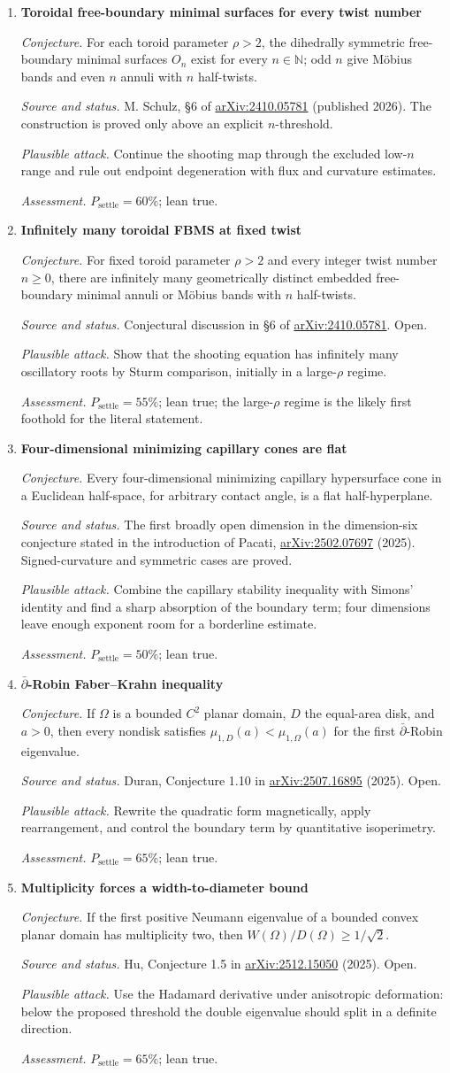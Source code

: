 \documentclass[11pt]{article}
\newcommand{\cand}[5]{%
  \item \textbf{#1}\par
  \emph{Conjecture.} #2\par
  \emph{Source and status.} #3\par
  \emph{Plausible attack.} #4\par
  \emph{Assessment.} #5
}
\newcommand{\psettle}{P_{\mathrm{settle}}}
\begin{document}
\begin{enumerate}[label=\textbf{L\arabic*.}]
\cand{Toroidal free-boundary minimal surfaces for every twist number}
{For each toroid parameter $\rho>2$, the dihedrally symmetric free-boundary minimal surfaces $O_n$ exist for every $n\in\mathbb N$; odd $n$ give M\"obius bands and even $n$ annuli with $n$ half-twists.}
{M. Schulz, \S6 of \href{https://arxiv.org/abs/2410.05781}{arXiv:2410.05781} (published 2026).  The construction is proved only above an explicit $n$-threshold.}
{Continue the shooting map through the excluded low-$n$ range and rule out endpoint degeneration with flux and curvature estimates.}
{$\psettle=60\%$; lean true.}

\cand{Infinitely many toroidal FBMS at fixed twist}
{For fixed toroid parameter $\rho>2$ and every integer twist number $n\ge0$, there are infinitely many geometrically distinct embedded free-boundary minimal annuli or M\"obius bands with $n$ half-twists.}
{Conjectural discussion in \S6 of \href{https://arxiv.org/abs/2410.05781}{arXiv:2410.05781}.  Open.}
{Show that the shooting equation has infinitely many oscillatory roots by Sturm comparison, initially in a large-$\rho$ regime.}
{$\psettle=55\%$; lean true; the large-$\rho$ regime is the likely first foothold for the literal statement.}

\cand{Four-dimensional minimizing capillary cones are flat}
{Every four-dimensional minimizing capillary hypersurface cone in a Euclidean half-space, for arbitrary contact angle, is a flat half-hyperplane.}
{The first broadly open dimension in the dimension-six conjecture stated in the introduction of Pacati, \href{https://arxiv.org/abs/2502.07697}{arXiv:2502.07697} (2025).  Signed-curvature and symmetric cases are proved.}
{Combine the capillary stability inequality with Simons' identity and find a sharp absorption of the boundary term; four dimensions leave enough exponent room for a borderline estimate.}
{$\psettle=50\%$; lean true.}

\cand{$\bar\partial$-Robin Faber--Krahn inequality}
{If $\Omega$ is a bounded $C^2$ planar domain, $D$ the equal-area disk, and $a>0$, then every nondisk satisfies $\mu_{1,D}(a)<\mu_{1,\Omega}(a)$ for the first $\bar\partial$-Robin eigenvalue.}
{Duran, Conjecture 1.10 in \href{https://arxiv.org/abs/2507.16895}{arXiv:2507.16895} (2025).  Open.}
{Rewrite the quadratic form magnetically, apply rearrangement, and control the boundary term by quantitative isoperimetry.}
{$\psettle=65\%$; lean true.}

\cand{Multiplicity forces a width-to-diameter bound}
{If the first positive Neumann eigenvalue of a bounded convex planar domain has multiplicity two, then $W(\Omega)/D(\Omega)\ge1/\sqrt2$.}
{Hu, Conjecture 1.5 in \href{https://arxiv.org/abs/2512.15050}{arXiv:2512.15050} (2025).  Open.}
{Use the Hadamard derivative under anisotropic deformation: below the proposed threshold the double eigenvalue should split in a definite direction.}
{$\psettle=65\%$; lean true.}


\end{enumerate}
\end{document}
